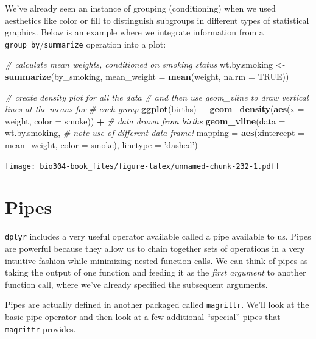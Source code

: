 \documentclass[]{book}
\newenvironment{Shaded}{\begin{snugshade}}{\end{snugshade}}
\newcommand{\CommentTok}[1]{\textcolor[rgb]{0.56,0.35,0.01}{\textit{#1}}}
\newcommand{\DataTypeTok}[1]{\textcolor[rgb]{0.13,0.29,0.53}{#1}}
\newcommand{\KeywordTok}[1]{\textcolor[rgb]{0.13,0.29,0.53}{\textbf{#1}}}
\newcommand{\NormalTok}[1]{#1}
\newcommand{\OperatorTok}[1]{\textcolor[rgb]{0.81,0.36,0.00}{\textbf{#1}}}
\newcommand{\OtherTok}[1]{\textcolor[rgb]{0.56,0.35,0.01}{#1}}
\newcommand{\StringTok}[1]{\textcolor[rgb]{0.31,0.60,0.02}{#1}}
\theoremstyle{definition}
\theoremstyle{definition}
\theoremstyle{definition}
\theoremstyle{remark}
\begin{document}
We've already seen an instance of grouping (conditioning) when we used
aesthetics like color or fill to distinguish subgroups in different
types of statistical graphics. Below is an example where we integrate
information from a \texttt{group\_by}/\texttt{summarize} operation into
a plot:

\begin{Shaded}
\begin{Highlighting}[]
\CommentTok{# calculate mean weights, conditioned on smoking status}
\NormalTok{wt.by.smoking <-}\StringTok{ }
\StringTok{  }\KeywordTok{summarize}\NormalTok{(by_smoking, }\DataTypeTok{mean_weight =} \KeywordTok{mean}\NormalTok{(weight, }\DataTypeTok{na.rm =} \OtherTok{TRUE}\NormalTok{))}

\CommentTok{# create density plot for all the data}
\CommentTok{# and then use geom_vline to draw vertical lines at the means for}
\CommentTok{# each group}
\KeywordTok{ggplot}\NormalTok{(births) }\OperatorTok{+}\StringTok{ }
\StringTok{  }\KeywordTok{geom_density}\NormalTok{(}\KeywordTok{aes}\NormalTok{(}\DataTypeTok{x =}\NormalTok{ weight, }\DataTypeTok{color =}\NormalTok{ smoke)) }\OperatorTok{+}\StringTok{ }\CommentTok{# data drawn from births}
\StringTok{  }\KeywordTok{geom_vline}\NormalTok{(}\DataTypeTok{data =}\NormalTok{ wt.by.smoking,  }\CommentTok{# note use of different data frame!}
             \DataTypeTok{mapping =} \KeywordTok{aes}\NormalTok{(}\DataTypeTok{xintercept =}\NormalTok{ mean_weight, }\DataTypeTok{color =}\NormalTok{ smoke),}
             \DataTypeTok{linetype =} \StringTok{'dashed'}\NormalTok{)}
\end{Highlighting}
\end{Shaded}

\texttt{[image: bio304-book\_files/figure-latex/unnamed-chunk-232-1.pdf]}

\hypertarget{pipes}{%
\section{Pipes}\label{pipes}}

\texttt{dplyr} includes a very useful operator available called a pipe
available to us. Pipes are powerful because they allow us to chain
together sets of operations in a very intuitive fashion while minimizing
nested function calls. We can think of pipes as taking the output of one
function and feeding it as the \emph{first argument} to another function
call, where we've already specified the subsequent arguments.

Pipes are actually defined in another packaged called \texttt{magrittr}.
We'll look at the basic pipe operator and then look at a few additional
``special'' pipes that \texttt{magrittr} provides.
\end{document}
